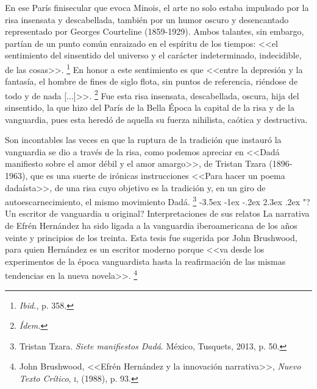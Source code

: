 \documentclass[14pt,twoside,final]{extbook} %
\makeatletter
\let\oldfootnote\footnote
\renewcommand\footnote[1]{%
\oldfootnote{\hspace{1mm}#1}}
\renewcommand\section{\@startsection {section}{1}{\z@}%
                                     {-3.5ex \@plus -1ex \@minus -.2ex}%
                                     {2.3ex \@plus .2ex}%
                                     {\normalfont\large\bfseries\sc}}
\makeatother
\begin{document}
En ese París finisecular que evoca Minois, el arte no solo estaba impulsado por la risa insensata y descabellada, también por un humor oscuro y desencantado representado por Georges Courteline (1859-1929). Ambos talantes, sin embargo, partían de un punto común enraizado en el espíritu de los tiempos: <<el sentimiento del sinsentido del universo y el carácter indeterminado, indecidible, de las cosas>>.\footnote{\emph{Ibid.}, p. 358.} En honor a este sentimiento es que <<entre la depresión y la fantasía, el hombre de fines de siglo flota, sin puntos de referencia, riéndose de todo y de nada [...]>>.\footnote{\emph{Ídem.}} Fue esta risa insensata, descabellada, oscura, hija del sinsentido, la que hizo del París de la Bella Época la capital de la risa y de la vanguardia, pues esta heredó de aquella
su fuerza nihilista, caótica y destructiva.

Son incontables las veces en que la ruptura de la tradición que instauró la vanguardia se dio a través de la risa, como podemos apreciar en <<Dadá manifiesto sobre el amor débil y el amor amargo>>, de Tristan Tzara (\mbox{1896-1963}), que es una suerte de irónicas instrucciones <<Para hacer un poema dadaísta>>, de una risa cuyo objetivo es la tradición y, en un giro de autoescarnecimiento, el mismo movimiento Dadá.\footnote{Tristan Tzara. \emph{Siete manifiestos Dadá}. México, Tusquets, 2013, p. 50.}
\section{\texorpdfstring{"?Un escritor de vanguardia u original? Interpretaciones de sus relatos}{¿Un escritor de vanguardia u original? Interpretaciones de sus relatos}}\label{sec:un-escritor-de-vanguardia-u-original-interprestaciones-de-sus-relatos}
La narrativa de Efrén Hernández ha sido ligada a la vanguardia iberoamericana de los años veinte y principios de los treinta. Esta tesis fue sugerida por John Brushwood, para quien Hernández es un escritor moderno porque <<va desde los experimentos de la época vanguardista hasta la reafirmación de las mismas tendencias en la nueva novela>>.\footnote{John Brushwood, <<Efrén Hernández y la innovación narrativa>>, \emph{Nuevo Texto Crítico}, \textsc{i}, (1988), p. 93.}
\end{document}
